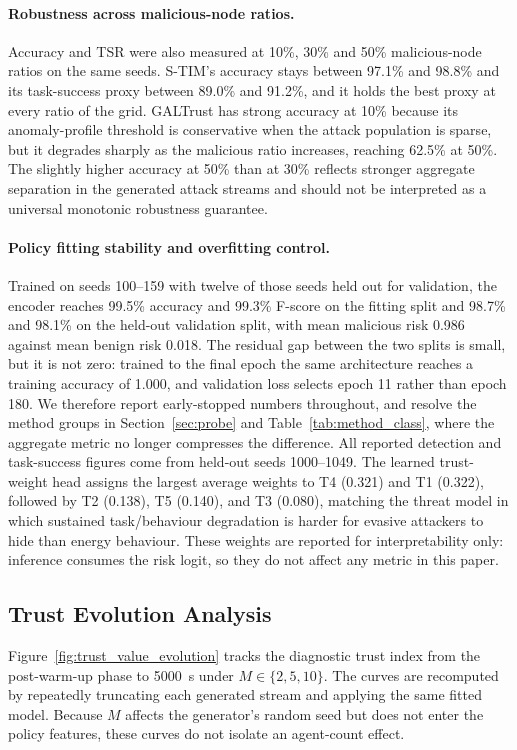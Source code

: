 \documentclass[notspecified,article,submit,moreauthors]{Definitions/mdpi}
\begin{document}
\paragraph{Robustness across malicious-node ratios.}
Accuracy and TSR were also measured at 10\%, 30\% and 50\% malicious-node ratios on the same seeds. S-TIM's accuracy stays between 97.1\% and 98.8\% and its task-success proxy between 89.0\% and 91.2\%, and it holds the best proxy at every ratio of the grid. GALTrust has strong accuracy at 10\% because its anomaly-profile threshold is conservative when the attack population is sparse, but it degrades sharply as the malicious ratio increases, reaching 62.5\% at 50\%. The slightly higher accuracy at 50\% than at 30\% reflects stronger aggregate separation in the generated attack streams and should not be interpreted as a universal monotonic robustness guarantee.

\paragraph{Policy fitting stability and overfitting control.}
Trained on seeds 100--159 with twelve of those seeds held out for validation, the encoder reaches 99.5\% accuracy and 99.3\% F-score on the fitting split and 98.7\% and 98.1\% on the held-out validation split, with mean malicious risk 0.986 against mean benign risk 0.018. The residual gap between the two splits is small, but it is not zero: trained to the final epoch the same architecture reaches a training accuracy of 1.000, and validation loss selects epoch 11 rather than epoch 180. We therefore report early-stopped numbers throughout, and resolve the method groups in Section~\ref{sec:probe} and Table~\ref{tab:method_class}, where the aggregate metric no longer compresses the difference. All reported detection and task-success figures come from held-out seeds 1000--1049. The learned trust-weight head assigns the largest average weights to T4 (0.321) and T1 (0.322), followed by T2 (0.138), T5 (0.140), and T3 (0.080), matching the threat model in which sustained task/behaviour degradation is harder for evasive attackers to hide than energy behaviour. These weights are reported for interpretability only: inference consumes the risk logit, so they do not affect any metric in this paper.

\subsection{Trust Evolution Analysis}
\label{sec:trust_evolution}
Figure~\ref{fig:trust_value_evolution} tracks the diagnostic trust index from the post-warm-up phase to 5000~s under $M \in \{2,5,10\}$. The curves are recomputed by repeatedly truncating each generated stream and applying the same fitted model. Because $M$ affects the generator's random seed but does not enter the policy features, these curves do not isolate an agent-count effect.
\end{document}

